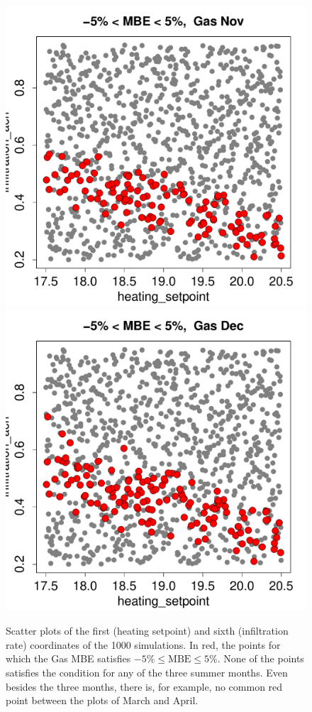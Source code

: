 \documentclass[a4paper, 12pt]{article}
\begin{document}
\begin{figure}
 \includegraphics[width=\scale]{MBE/SelectedMBE_Gas_11.pdf}
 \includegraphics[width=\scale]{MBE/SelectedMBE_Gas_12.pdf}\\
 \caption{Scatter plots of the first (heating setpoint) and sixth (infiltration rate) coordinates of the 1000 simulations. In red, the points for which the Gas MBE satisfies $-5\% \leq \text{MBE} \leq 5\%$. None of the points satisfies the condition for any of the three summer months. Even besides the three months, there is, for example, no common red point between the plots of March and April.}
 \label{Fig_Output_Hist}
\end{figure}

\end{document}
